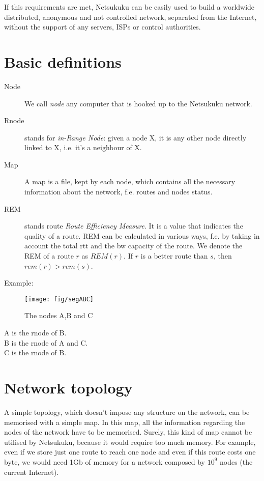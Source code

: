 \documentclass[a4paper]{article}
\begin{document}
If this requirements are met, Netsukuku can be easily used to build a worldwide
distributed, anonymous and not controlled network, separated from the
Internet, without the support of any servers, ISPs or control authorities.

\section{Basic definitions}

\begin{description}
	\item[Node] We call \emph{node} any computer that is hooked up to the
		Netsukuku network.
	\item[Rnode] stands for \emph{in-Range Node}: given a node X, it is any other
		node directly linked to X, i.e. it's a neighbour of X.
	\item[Map] A map is a file, kept by each node, which contains all the
		necessary information about the network, f.e. routes and nodes
		status.
	\item[REM] stands route \emph{Route Efficiency Measure}. It is 
		a value that indicates the quality of a route. 
		REM can be calculated in various ways, f.e. by taking in
		account the total rtt and the bw capacity of the route.  We denote the REM of
a route $r$ as $REM(r)$. If $r$ is a better route than $s$, then
$rem(r)>rem(s)$.

\end{description}
Example:\\
\begin{figure}[h]
	\begin{center}
		\texttt{[image: fig/segABC]}
	\end{center}
	\caption{The nodes A,B and C}
\end{figure}
A is the rnode of B.\\
B is the rnode of A and C.\\
C is the rnode of B.

\section{Network topology}
\label{sec:net_topology}

A simple topology, which doesn't impose any structure on the network, can be
memorised with a simple map. In this map, all the information regarding the
nodes of the network have to be memorised. Surely, this kind of map cannot be
utilised by Netsukuku, because it would require too much memory.
For example, even if we store just one route to reach one node and even if
this route costs one byte, we would need 1Gb of memory for a network composed
by $10^9$ nodes (the current Internet).
\end{document}
